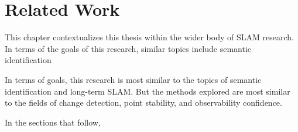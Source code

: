 \section{Related Work}
\label{sec:related_work}

This chapter contextualizes this thesis within the wider body of SLAM research. In terms of the goals of this research, similar topics include semantic identification

In terms of goals, this research is most similar to the topics of semantic identification and long-term SLAM. But the methods explored are most similar to the fields of change detection, point stability, and observability confidence.

In the sections that follow,
% 